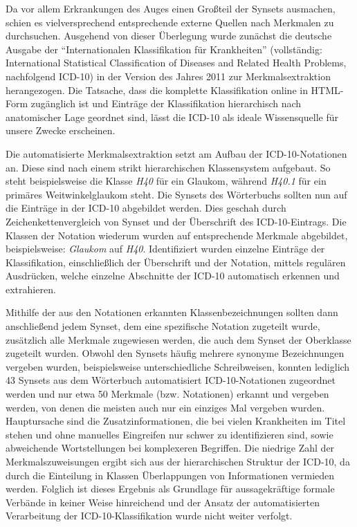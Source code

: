 \documentclass[pagesize,paper=A4,DIV=calc,fontsize=12pt,draft=false]{scrreprt}
\begin{document}
Da vor allem Erkrankungen des Auges einen Großteil der Synsets ausmachen, schien es vielversprechend entsprechende externe Quellen nach Merkmalen zu durchsuchen. 
Ausgehend von dieser Überlegung wurde zunächst die deutsche Ausgabe der \enquote{Internationalen Klassifikation für Krankheiten} (vollständig: International Statistical Classification of Diseases and Related Health Problems, nachfolgend ICD-10) in der Version des Jahres 2011 zur Merkmalsextraktion herangezogen. 
Die Tatsache, dass die komplette Klassifikation online in HTML-Form zugänglich ist und Einträge der Klassifikation hierarchisch nach anatomischer Lage geordnet sind, lässt die ICD-10 als ideale Wissensquelle für unsere Zwecke erscheinen. 

Die automatisierte Merkmalsextraktion setzt am Aufbau der ICD-10-Notationen an. 
Diese sind nach einem strikt hierarchischen Klassensystem aufgebaut. 
So steht beispielsweise die Klasse \emph{H40} für ein Glaukom, während \emph{H40.1} für ein primäres Weitwinkelglaukom steht. 
Die Synsets des Wörterbuchs sollten nun auf die Einträge in der ICD-10 abgebildet werden. 
Dies geschah durch Zeichenkettenvergleich von Synset und der Überschrift des ICD-10-Eintrags. 
Die Klassen der Notation wiederum wurden auf entsprechende Merkmale abgebildet, beispielsweise: \emph{Glaukom} auf \emph{H40}. 
Identifiziert wurden einzelne Einträge der Klassifikation, einschließlich der Überschrift und der Notation, mittels regulären Ausdrücken, welche einzelne Abschnitte der ICD-10 automatisch erkennen und extrahieren. 

Mithilfe der aus den Notationen erkannten Klassenbezeichnungen sollten dann anschließend jedem Synset, dem eine spezifische Notation zugeteilt wurde, zusätzlich alle Merkmale zugewiesen werden, die auch dem Synset der Oberklasse zugeteilt wurden. 
Obwohl den Synsets häufig mehrere synonyme Bezeichnungen vergeben wurden, beispielsweise unterschiedliche Schreibweisen, konnten lediglich 43 Synsets aus dem Wörterbuch automatisiert ICD-10-Notationen zugeordnet werden und nur etwa 50 Merkmale (bzw. Notationen) erkannt und vergeben werden, von denen die meisten auch nur ein einziges Mal vergeben wurden.  
Hauptursache sind die Zusatzinformationen, die bei vielen Krankheiten im Titel stehen und ohne manuelles Eingreifen nur schwer zu identifizieren sind, sowie abweichende Wortstellungen bei komplexeren Begriffen. 
Die niedrige Zahl der Merkmalszuweisungen ergibt sich aus der hierarchischen Struktur der ICD-10, da durch die Einteilung in Klassen Überlappungen von Informationen vermieden werden. 
Folglich ist dieses Ergebnis als Grundlage für aussagekräftige formale Verbände in keiner Weise hinreichend und der Ansatz der automatisierten Verarbeitung der ICD-10-Klassifikation wurde nicht weiter verfolgt. 
\end{document}
